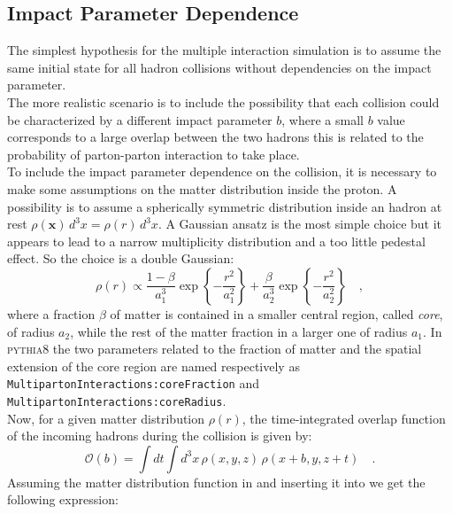\subsection{Impact Parameter Dependence}

The simplest hypothesis for the multiple interaction simulation is to assume the same initial state for all hadron collisions without dependencies on the impact parameter. 
\\
The more realistic scenario is to include the possibility that each collision could be characterized by a different impact parameter $b$, where a small $b$ value corresponds to a large overlap between the two hadrons this is related to the probability of parton-parton interaction to take place.
\\
To include the impact parameter dependence on the collision, it is necessary to make some assumptions on the matter distribution inside the proton. A possibility is to assume a spherically symmetric distribution inside an hadron at rest $\rho(\mathbf{x})\,d^3x=\rho(r)\,d^3x$. A Gaussian ansatz is the most simple choice but it appears to lead to a narrow multiplicity distribution and a too little pedestal effect. So the choice is a double Gaussian:
\begin{equation}
	\rho(r) \propto \frac{1-\beta}{a_1^3}\exp\left\{-\frac{r^2}{a_1^2}\right\}+\frac{\beta}{a_2^3}\exp\left\{ -\frac{r^2}{a_2^2} \right\}\quad,
	\label{eq:matterDistribution}
\end{equation}
where a fraction $\beta$ of matter is contained in a smaller central region, called \textit{core}, of radius $a_2$, while the rest of the matter fraction in a larger one of radius $a_1$. In \textsc{pythia8} the two parameters related to the fraction of matter and the spatial extension of the core region are named respectively as \texttt{Multiparton}\-\texttt{Interactions:}\-\texttt{core}\-\texttt{Fraction} and \texttt{Multiparton}\-\texttt{Interactions:}\-\texttt{core}\-\texttt{Radius}.
\\
Now, for a given matter distribution $\rho(r)$,  the time-integrated overlap function of the incoming hadrons during the collision is given by:
\begin{equation}
	\mathcal{O}(b)=\displaystyle\int dt \displaystyle\int d^3x\,\rho(x,y,z)\,\rho(x+b,y,z+t)\quad.
	\label{eq:overlappingFunction}
\end{equation} 
Assuming the matter distribution function in  and inserting it into  we get  the following expression:
